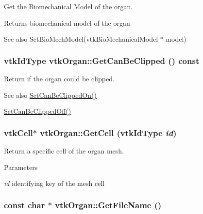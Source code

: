 Get the Biomechanical Model of the organ. 

\begin{DoxyReturn}{Returns}
biomechanical model of the organ 
\end{DoxyReturn}
\begin{DoxySeeAlso}{See also}
SetBioMechModel(vtkBioMechanicalModel $\ast$ model) 
\end{DoxySeeAlso}
\hypertarget{classvtkOrgan_a3a20226df6f6df2a83b2ee0be190c452}{
\subsubsection[{GetCanBeClipped}]{\setlength{\rightskip}{0pt plus 5cm}vtkIdType vtkOrgan::GetCanBeClipped () const}}
\label{classvtkOrgan_a3a20226df6f6df2a83b2ee0be190c452}


Return if the organ could be clipped. 

\begin{DoxySeeAlso}{See also}
\hyperlink{classvtkOrgan_a65da602da9636309dcfa094b537a9fef}{SetCanBeClippedOn()} 

\hyperlink{classvtkOrgan_a6faee69d6495879b5f545bf1446dd304}{SetCanBeClippedOff()} 
\end{DoxySeeAlso}
\hypertarget{classvtkOrgan_a715bbd46dbfc1838b2d76135126ac59c}{
\subsubsection[{GetCell}]{\setlength{\rightskip}{0pt plus 5cm}vtkCell$\ast$ vtkOrgan::GetCell (vtkIdType {\em id})}}
\label{classvtkOrgan_a715bbd46dbfc1838b2d76135126ac59c}


Return a specific cell of the organ mesh. 


\begin{DoxyParams}{Parameters}
\item[{\em id}]identifying key of the mesh cell \end{DoxyParams}
\hypertarget{classvtkOrgan_a83331bddcf2a07b54a5df5e6e23b130f}{
\subsubsection[{GetFileName}]{\setlength{\rightskip}{0pt plus 5cm}const char $\ast$ vtkOrgan::GetFileName ()}}
\label{classvtkOrgan_a83331bddcf2a07b54a5df5e6e23b130f}


